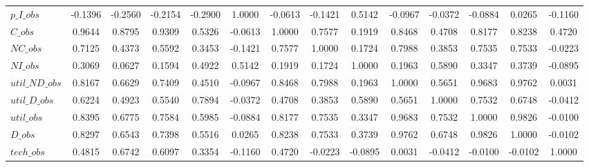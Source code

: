 \begin{center}
\begin{longtable}{lccccccccccccc}
$p\_I\_obs      $	 & 	          -0.1396	 & 	          -0.2560	 & 	          -0.2154	 & 	          -0.2900	 & 	           1.0000	 & 	          -0.0613	 & 	          -0.1421	 & 	           0.5142	 & 	          -0.0967	 & 	          -0.0372	 & 	          -0.0884	 & 	           0.0265	 & 	          -0.1160 \\ 
$C\_obs         $	 & 	           0.9644	 & 	           0.8795	 & 	           0.9309	 & 	           0.5326	 & 	          -0.0613	 & 	           1.0000	 & 	           0.7577	 & 	           0.1919	 & 	           0.8468	 & 	           0.4708	 & 	           0.8177	 & 	           0.8238	 & 	           0.4720 \\ 
$NC\_obs        $	 & 	           0.7125	 & 	           0.4373	 & 	           0.5592	 & 	           0.3453	 & 	          -0.1421	 & 	           0.7577	 & 	           1.0000	 & 	           0.1724	 & 	           0.7988	 & 	           0.3853	 & 	           0.7535	 & 	           0.7533	 & 	          -0.0223 \\ 
$NI\_obs        $	 & 	           0.3069	 & 	           0.0627	 & 	           0.1594	 & 	           0.4922	 & 	           0.5142	 & 	           0.1919	 & 	           0.1724	 & 	           1.0000	 & 	           0.1963	 & 	           0.5890	 & 	           0.3347	 & 	           0.3739	 & 	          -0.0895 \\ 
$util\_ND\_obs  $	 & 	           0.8167	 & 	           0.6629	 & 	           0.7409	 & 	           0.4510	 & 	          -0.0967	 & 	           0.8468	 & 	           0.7988	 & 	           0.1963	 & 	           1.0000	 & 	           0.5651	 & 	           0.9683	 & 	           0.9762	 & 	           0.0031 \\ 
$util\_D\_obs   $	 & 	           0.6224	 & 	           0.4923	 & 	           0.5540	 & 	           0.7894	 & 	          -0.0372	 & 	           0.4708	 & 	           0.3853	 & 	           0.5890	 & 	           0.5651	 & 	           1.0000	 & 	           0.7532	 & 	           0.6748	 & 	          -0.0412 \\ 
$util\_obs      $	 & 	           0.8395	 & 	           0.6775	 & 	           0.7584	 & 	           0.5985	 & 	          -0.0884	 & 	           0.8177	 & 	           0.7535	 & 	           0.3347	 & 	           0.9683	 & 	           0.7532	 & 	           1.0000	 & 	           0.9826	 & 	          -0.0100 \\ 
$D\_obs         $	 & 	           0.8297	 & 	           0.6543	 & 	           0.7398	 & 	           0.5516	 & 	           0.0265	 & 	           0.8238	 & 	           0.7533	 & 	           0.3739	 & 	           0.9762	 & 	           0.6748	 & 	           0.9826	 & 	           1.0000	 & 	          -0.0102 \\ 
$tech\_obs      $	 & 	           0.4815	 & 	           0.6742	 & 	           0.6097	 & 	           0.3354	 & 	          -0.1160	 & 	           0.4720	 & 	          -0.0223	 & 	          -0.0895	 & 	           0.0031	 & 	          -0.0412	 & 	          -0.0100	 & 	          -0.0102	 & 	           1.0000 \\ 
\end{longtable}
 \end{center}
